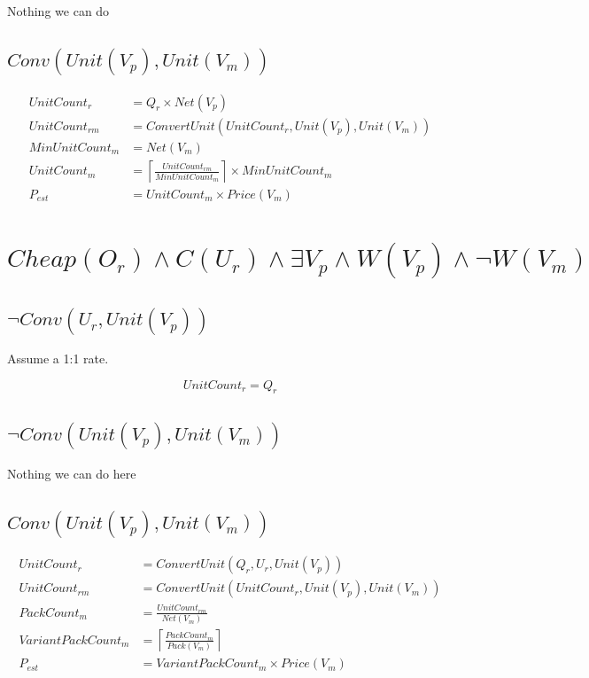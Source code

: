\documentclass[11pt]{article}
\begin{document}
Nothing we can do

\subsection{$Conv(Unit(V_p), Unit(V_m))$}

\begin{align}
	UnitCount_r &= Q_r\times Net(V_p) \\
	UnitCount_{rm} &= ConvertUnit(UnitCount_r, Unit(V_p), Unit(V_m)) \\
	MinUnitCount_m &= Net(V_m) \\
	UnitCount_m &= \left\lceil\frac{UnitCount_{rm}}{MinUnitCount_m}\right\rceil\times MinUnitCount_m \\
	P_{est} &= UnitCount_m\times Price(V_m)
\end{align}

\section{$Cheap(O_r)\wedge C(U_r)\wedge\exists V_p\wedge W(V_p)\wedge\neg W(V_m)$}

\subsection{$\neg Conv(U_r,Unit(V_p))$}

Assume a 1:1 rate.

\begin{equation}
	UnitCount_r=Q_r
\end{equation}

\subsection{$\neg Conv(Unit(V_p), Unit(V_m))$}

Nothing we can do here

\subsection{$Conv(Unit(V_p), Unit(V_m))$}

\begin{align}
	UnitCount_r &= ConvertUnit(Q_r, U_r, Unit(V_p)) \\
	UnitCount_{rm} &= ConvertUnit(UnitCount_r, Unit(V_p), Unit(V_m)) \\
	PackCount_m &=\frac{UnitCount_{rm}}{Net(V_m)} \\
	VariantPackCount_m &= \left\lceil\frac{PackCount_m}{Pack(V_m)}\right\rceil \\
	P_{est} &= VariantPackCount_m\times Price(V_m)
\end{align}
\end{document}
